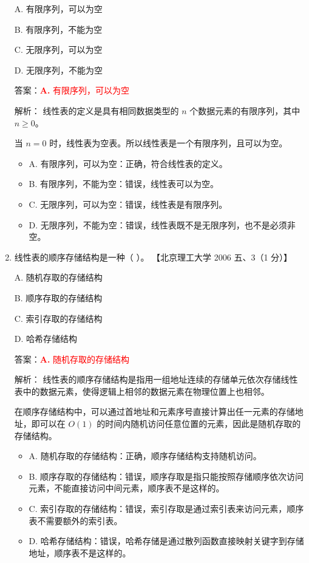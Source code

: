\documentclass[lang=cn,newtx,10pt,scheme=chinese]{../../../elegantbook}
\begin{document}
\begin{enumerate}
        A. 有限序列，可以为空  
    
        B. 有限序列，不能为空  
    
        C. 无限序列，可以为空  
    
        D. 无限序列，不能为空  

        答案：\textcolor{red}{\textbf{A.} 有限序列，可以为空}

        解析：
        线性表的定义是具有相同数据类型的 $n$ 个数据元素的有限序列，其中 $n \geq 0$。

        当 $n = 0$ 时，线性表为空表。所以线性表是一个有限序列，且可以为空。

        \begin{itemize}
            \item A. 有限序列，可以为空：正确，符合线性表的定义。
            \item B. 有限序列，不能为空：错误，线性表可以为空。
            \item C. 无限序列，可以为空：错误，线性表是有限序列。
            \item D. 无限序列，不能为空：错误，线性表既不是无限序列，也不是必须非空。
        \end{itemize}
    
        \item 线性表的顺序存储结构是一种（ ）。  
        【北京理工大学 2006 五、3（1 分）】  
    
        A. 随机存取的存储结构  
    
        B. 顺序存取的存储结构  
    
        C. 索引存取的存储结构  
    
        D. 哈希存储结构  

        答案：\textcolor{red}{\textbf{A.} 随机存取的存储结构}

        解析：
        线性表的顺序存储结构是指用一组地址连续的存储单元依次存储线性表中的数据元素，使得逻辑上相邻的数据元素在物理位置上也相邻。

        在顺序存储结构中，可以通过首地址和元素序号直接计算出任一元素的存储地址，即可以在 $O(1)$ 的时间内随机访问任意位置的元素，因此是随机存取的存储结构。

        \begin{itemize}
            \item A. 随机存取的存储结构：正确，顺序存储结构支持随机访问。
            \item B. 顺序存取的存储结构：错误，顺序存取是指只能按照存储顺序依次访问元素，不能直接访问中间元素，顺序表不是这样的。
            \item C. 索引存取的存储结构：错误，索引存取是通过索引表来访问元素，顺序表不需要额外的索引表。
            \item D. 哈希存储结构：错误，哈希存储是通过散列函数直接映射关键字到存储地址，顺序表不是这样的。
        \end{itemize}
    

\end{enumerate}
\end{document}
